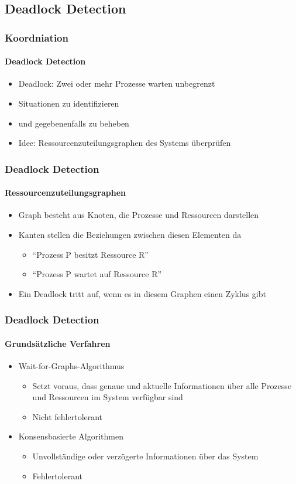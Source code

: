 \subsection{Deadlock Detection}
\begin{frame}
  \frametitle{Koordniation}
  \framesubtitle{Deadlock Detection}
  \begin{itemize}
    \item Deadlock: Zwei oder mehr Prozesse warten unbegrenzt
    \item Situationen zu identifizieren 
    \item und gegebenenfalls zu beheben
    \item Idee: Ressourcenzuteilungsgraphen des Systems überprüfen
  \end{itemize}
\end{frame}

\begin{frame}
  \frametitle{Deadlock Detection}
  \framesubtitle{Ressourcenzuteilungsgraphen}
  \begin{itemize}
    \item Graph besteht aus Knoten, die Prozesse und Ressourcen darstellen
    \item Kanten stellen die Beziehungen zwischen diesen Elementen da
    \begin{itemize}
      \item \enquote{Prozess P besitzt Ressource R}
      \item \enquote{Prozess P wartet auf Ressource R}
    \end{itemize}  
    \item Ein Deadlock tritt auf, wenn es in diesem Graphen einen Zyklus gibt
  \end{itemize}
\end{frame}

\begin{frame}
  \frametitle{Deadlock Detection}
  \framesubtitle{Grundsätzliche Verfahren}
  \begin{itemize}
    \item Wait-for-Graphs-Algorithmus
    \begin{itemize}
      \item Setzt voraus, dass genaue und aktuelle Informationen über alle Prozesse und Ressourcen im System verfügbar sind
      \item Nicht fehlertolerant
    \end{itemize}  
    \item Konsensbasierte Algorithmen 
    \begin{itemize}
      \item Unvollständige oder verzögerte Informationen über das System
      \item Fehlertolerant 
    \end{itemize}  
  \end{itemize}
\end{frame}